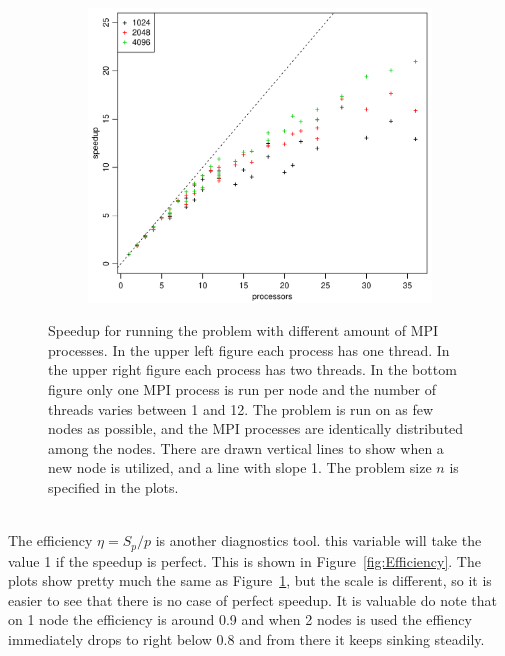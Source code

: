 \begin{figure}[h!]
  \quad
  \begin{subfigure}[b]{0.48\textwidth}
    \includegraphics[width=\textwidth]{./Figures/taskbSpeedupNodesTimesThreads.pdf}
  \end{subfigure}
  \vspace{-0.1\baselineskip}
\caption{Speedup for running the problem with different amount of MPI processes. In the upper left figure each process has one thread. In the upper right figure each process has two threads. In the bottom figure only one MPI process is run per node and the number of threads varies between 1 and 12. The problem is run on as few nodes as possible, and the MPI processes are identically distributed among the nodes. There are drawn vertical lines to show when a new node is utilized, and a line with slope 1. The problem size $n$ is specified in the plots. }
  \label{fig:Speedup}
\end{figure}
%
\\
The efficiency $\eta = S_p/p $ is another diagnostics tool. this variable will take the value 1 if the speedup is perfect. This is shown in Figure~\ref{fig:Efficiency}. The plots show pretty much the same as Figure~\ref{fig:Speedup}, but the scale is different, so it is easier to see that there is no case of perfect speedup. It is valuable do note that on 1 node the efficiency is around 0.9 and when 2 nodes is used the effiency immediately drops to right below 0.8 and from there it keeps sinking steadily. 
